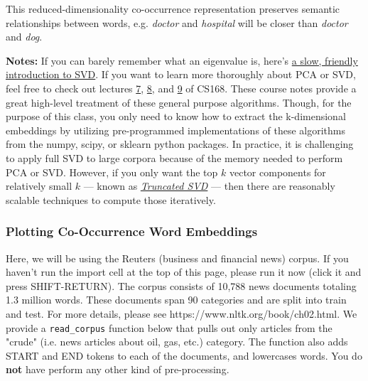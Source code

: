 \documentclass[11pt]{article}
\begin{document}
This reduced-dimensionality co-occurrence representation preserves
semantic relationships between words, e.g. \emph{doctor} and
\emph{hospital} will be closer than \emph{doctor} and \emph{dog}.

\textbf{Notes:} If you can barely remember what an eigenvalue is, here's
\href{https://davetang.org/file/Singular_Value_Decomposition_Tutorial.pdf}{a
slow, friendly introduction to SVD}. If you want to learn more
thoroughly about PCA or SVD, feel free to check out lectures
\href{https://web.stanford.edu/class/cs168/l/l7.pdf}{7},
\href{http://theory.stanford.edu/~tim/s15/l/l8.pdf}{8}, and
\href{https://web.stanford.edu/class/cs168/l/l9.pdf}{9} of CS168. These
course notes provide a great high-level treatment of these general
purpose algorithms. Though, for the purpose of this class, you only need
to know how to extract the k-dimensional embeddings by utilizing
pre-programmed implementations of these algorithms from the numpy,
scipy, or sklearn python packages. In practice, it is challenging to
apply full SVD to large corpora because of the memory needed to perform
PCA or SVD. However, if you only want the top \(k\) vector components
for relatively small \(k\) --- known as
\emph{\href{https://en.wikipedia.org/wiki/Singular_value_decomposition\#Truncated_SVD}{Truncated
SVD}} --- then there are reasonably scalable techniques to compute those
iteratively.

    \subsubsection{Plotting Co-Occurrence Word
Embeddings}\label{plotting-co-occurrence-word-embeddings}

Here, we will be using the Reuters (business and financial news) corpus.
If you haven't run the import cell at the top of this page, please run
it now (click it and press SHIFT-RETURN). The corpus consists of 10,788
news documents totaling 1.3 million words. These documents span 90
categories and are split into train and test. For more details, please
see https://www.nltk.org/book/ch02.html. We provide a
\texttt{read\_corpus} function below that pulls out only articles from
the "crude" (i.e. news articles about oil, gas, etc.) category. The
function also adds START and END tokens to each of the documents, and
lowercases words. You do \textbf{not} have perform any other kind of
pre-processing.
\end{document}
